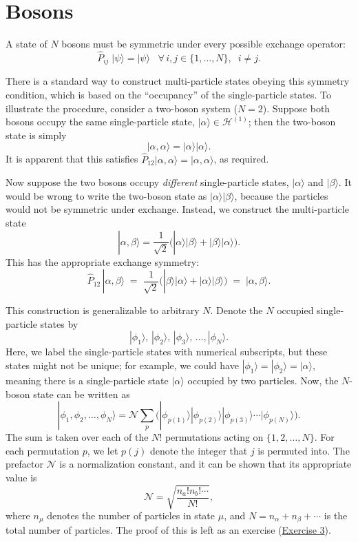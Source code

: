 \documentclass[pra,12pt]{revtex4}
\begin{document}
\section{Bosons}

A state of $N$ bosons must be symmetric under every possible exchange
operator:
$$\hat{P}_{ij}\; |\psi\rangle = |\psi\rangle \;\;\; \forall\, i, j \in\{1,\dots,N\},\;\; i\ne j.$$

There is a standard way to construct multi-particle states obeying
this symmetry condition, which is based on the ``occupancy'' of the
single-particle states.  To illustrate the procedure, consider a
two-boson system ($N = 2$).  Suppose both bosons occupy the same
single-particle state, $|\alpha\rangle \in \mathscr{H}^{(1)}$; then
the two-boson state is simply
$$|\alpha,\alpha\rangle = |\alpha\rangle  |\alpha\rangle.$$
It is apparent that this satisfies $\hat{P}_{12}
|\alpha,\alpha\rangle = |\alpha,\alpha\rangle$, as required.

Now suppose the two bosons occupy \textit{different} single-particle
states, $|\alpha\rangle$ and $|\beta\rangle$.  It would be wrong to
write the two-boson state as $|\alpha\rangle |\beta\rangle$, because
the particles would not be symmetric under exchange.  Instead, we
construct the multi-particle state
$$|\alpha,\beta\rangle = \frac{1}{\sqrt{2}} \Big( |\alpha\rangle  |\beta\rangle + |\beta\rangle  |\alpha\rangle\Big).$$
This has the appropriate exchange symmetry:
$$\hat{P}_{12}\,|\alpha,\beta\rangle \;=\; \frac{1}{\sqrt{2}} \Big( |\beta\rangle  |\alpha\rangle + |\alpha\rangle  |\beta\rangle\Big) \;=\; |\alpha,\beta\rangle.$$

This construction is generalizable to arbitrary $N$.  Denote the $N$
occupied single-particle states by
$$|\phi_1\rangle, \, |\phi_2\rangle, \, |\phi_3\rangle, \, \dots, |\phi_N\rangle.$$
Here, we label the single-particle states with numerical subscripts,
but these states might not be unique; for example, we could have
$|\phi_1\rangle = |\phi_2\rangle = |\alpha\rangle$, meaning there is a
single-particle state $|\alpha\rangle$ occupied by two particles.  Now, the
$N$-boson state can be written as
$$|\phi_1,\phi_2,\dots,\phi_N\rangle = \mathcal{N} \sum_p \Big(|\phi_{p(1)}\rangle  |\phi_{p(2)}\rangle  |\phi_{p(3)}\rangle  \cdots  |\phi_{p(N)}\rangle\Big).$$
The sum is taken over each of the $N!$ permutations acting on
$\{1,2,\dots,N\}$.  For each permutation $p$, we let $p(j)$ denote the
integer that $j$ is permuted into.  The prefactor $\mathcal{N}$ is a
normalization constant, and it can be shown that its appropriate value
is
$$\mathcal{N} = \sqrt{\frac{n_a!n_b!\cdots}{N!}},$$
where $n_\mu$ denotes the number of particles in state $\mu$, and $N =
n_\alpha + n_\beta + \cdots$ is the total number of particles.  The proof of
this is left as an exercise (\hyperref[ex:boson_norm]{Exercise 3}).
\end{document}
